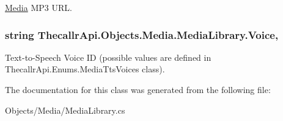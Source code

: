 \hyperlink{namespace_thecallr_api_1_1_objects_1_1_media}{Media} M\+P3 U\+R\+L. 

\hypertarget{class_thecallr_api_1_1_objects_1_1_media_1_1_media_library_a93fdc07d8cad82b6a52025e15783106c}{
\subsubsection[{Voice}]{\setlength{\rightskip}{0pt plus 5cm}string Thecallr\+Api.\+Objects.\+Media.\+Media\+Library.\+Voice\hspace{0.3cm}{\ttfamily [get]}, {\ttfamily [set]}}}\label{class_thecallr_api_1_1_objects_1_1_media_1_1_media_library_a93fdc07d8cad82b6a52025e15783106c}


Text-\/to-\/\+Speech Voice I\+D (possible values are defined in Thecallr\+Api.\+Enums.\+Media\+Tts\+Voices class). 



The documentation for this class was generated from the following file\+:\begin{DoxyCompactItemize}
\item 
Objects/\+Media/Media\+Library.\+cs\end{DoxyCompactItemize}

